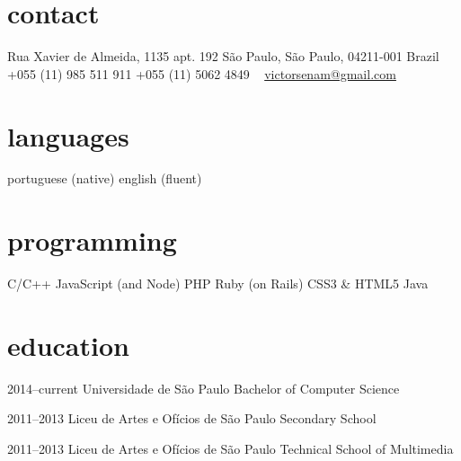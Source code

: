 \documentclass[]{friggeri-cv} %
\begin{document}


\begin{aside} %
\section{contact}
Rua Xavier de Almeida, 1135 apt. 192
São Paulo, São Paulo, 04211-001
Brazil
~
+055 (11) 985 511 911
+055 (11) 5062 4849
~
\href{mailto:victorsenam@gmail.com}{victorsenam@gmail.com}
\section{languages}
portuguese (native)
english (fluent)
\section{programming}
C/C++
JavaScript (and Node)
PHP
Ruby (on Rails)
CSS3 \& HTML5
Java
\end{aside}


\section{education}

\begin{entrylist}


\entry
{2014--current}
{Universidade de São Paulo}
{Bachelor of Computer Science}

\entry
{2011--2013}
{Liceu de Artes e Ofícios de São Paulo}
{Secondary School}

\entry
{2011--2013}
{Liceu de Artes e Ofícios de São Paulo}
{Technical School of Multimedia}


\end{entrylist}
\end{document}
